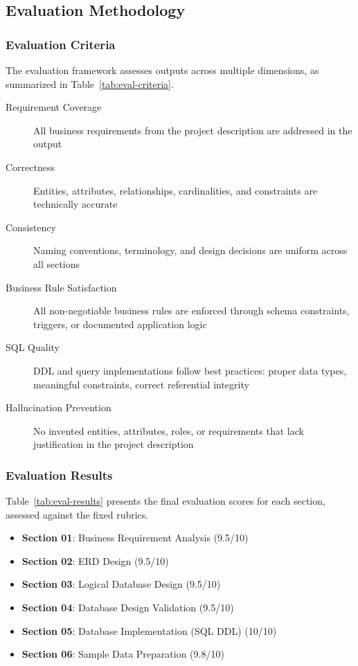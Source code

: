 
\subsection{Evaluation Methodology}

\subsubsection{Evaluation Criteria}

The evaluation framework assesses outputs across multiple dimensions, as summarized in Table~\ref{tab:eval-criteria}.

\begin{description}
    \item[Requirement Coverage] All business requirements from the project description are addressed in the output
    \item[Correctness] Entities, attributes, relationships, cardinalities, and constraints are technically accurate
    \item[Consistency] Naming conventions, terminology, and design decisions are uniform across all sections
    \item[Business Rule Satisfaction] All non-negotiable business rules are enforced through schema constraints, triggers, or documented application logic
    \item[SQL Quality] DDL and query implementations follow best practices: proper data types, meaningful constraints, correct referential integrity
    \item[Hallucination Prevention] No invented entities, attributes, roles, or requirements that lack justification in the project description
\end{description}

\subsubsection{Evaluation Results}

Table~\ref{tab:eval-results} presents the final evaluation scores for each section, assessed against the fixed rubrics.

\begin{itemize}
    \item \textbf{Section 01}: Business Requirement Analysis (9.5/10)
    \item \textbf{Section 02}: ERD Design (9.5/10)
    \item \textbf{Section 03}: Logical Database Design (9.5/10)
    \item \textbf{Section 04}: Database Design Validation (9.5/10)
    \item \textbf{Section 05}: Database Implementation (SQL DDL) (10/10)
    \item \textbf{Section 06}: Sample Data Preparation (9.8/10)
\end{itemize}

